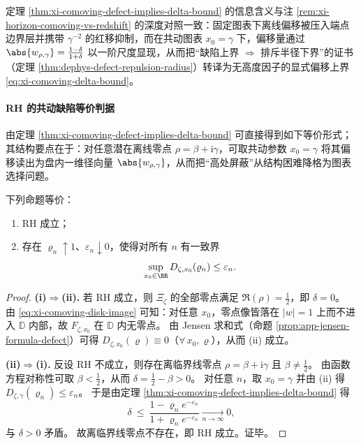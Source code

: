 

\begin{remark}\label{rem:xi-comoving-defect-visibility-upgrade}
定理 \ref{thm:xi-comoving-defect-implies-delta-bound} 的信息含义与注 \ref{rem:xi-horizon-comoving-vs-redshift} 的深度对照一致：固定图表下离线偏移被压入端点边界层并携带 \(\gamma^{-2}\) 的红移抑制，而在共动图表 \(x_0=\gamma\) 下，偏移量通过 \(\abs{w_{\rho,\gamma}}=\frac{1-\delta}{1+\delta}\) 以一阶尺度显现，从而把“缺陷上界 \(\Rightarrow\) 排斥半径下界”的证书（定理 \ref{thm:dephys-defect-repulsion-radius}）转译为无高度因子的显式偏移上界 \eqref{eq:xi-comoving-delta-bound}。
\end{remark}

\paragraph{RH 的共动缺陷等价判据}
由定理 \ref{thm:xi-comoving-defect-implies-delta-bound} 可直接得到如下等价形式；其结构要点在于：对任意潜在离线零点 \(\rho=\beta+\mathrm{i}\gamma\)，可取共动参数 \(x_0=\gamma\) 将其偏移读出为盘内一维径向量 \(\abs{w_{\rho,\gamma}}\)，从而把“高处屏蔽”从结构困难降格为图表选择问题。

\begin{theorem}\label{thm:xi-rh-iff-uniform-comoving-defect}
下列命题等价：
\begin{enumerate}
  \item[(i)] RH 成立；
  \item[(ii)] 存在 \(\varrho_n\uparrow 1\)、\(\varepsilon_n\downarrow 0\)，使得对所有 \(n\) 有一致界
  \[
  \sup_{x_0\in\RR}D_{\zeta,x_0}(\varrho_n)\le \varepsilon_n.
  \]
\end{enumerate}
\end{theorem}

\begin{proof}
\textbf{(i)\(\Rightarrow\)(ii).}
若 RH 成立，则 \(\Xi_{\zeta}\) 的全部零点满足 \(\Re(\rho)=\tfrac12\)，即 \(\delta=0\)。
由 \eqref{eq:xi-comoving-disk-image} 可知：对任意 \(x_0\)，零点像皆落在 \(|w|=1\) 上而不进入 \(\mathbb{D}\) 内部，故 \(F_{\zeta,x_0}\) 在 \(\mathbb{D}\) 内无零点。
由 Jensen 求和式（命题 \ref{prop:app-jensen-formula-defect}）可得 \(D_{\zeta,x_0}(\varrho)\equiv 0\)（\(\forall\,x_0,\varrho\)），从而 (ii) 成立。
\par
\textbf{(ii)\(\Rightarrow\)(i).}
反设 RH 不成立，则存在离临界线零点 \(\rho=\beta+\mathrm{i}\gamma\) 且 \(\beta\neq\tfrac12\)。
由函数方程对称性可取 \(\beta<\tfrac12\)，从而 \(\delta=\tfrac12-\beta>0\)。
对任意 \(n\)，取 \(x_0=\gamma\) 并由 (ii) 得 \(D_{\zeta,\gamma}(\varrho_n)\le\varepsilon_n\)。
于是由定理 \ref{thm:xi-comoving-defect-implies-delta-bound} 得
\[
\delta\ \le\ \frac{1-\varrho_n e^{-\varepsilon_n}}{1+\varrho_n e^{-\varepsilon_n}}\xrightarrow[n\to\infty]{}0,
\]
与 \(\delta>0\) 矛盾。
故离临界线零点不存在，即 RH 成立。证毕。
\end{proof}

